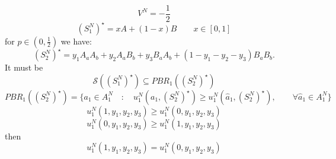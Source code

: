 \documentclass[a4paper, twoside, openany]{book}
\begin{document}
$$V^N = -\frac{1}{2}$$
$$(S^N_1)^{\star} = x A + (1 -x)B \qquad x \in [0, 1]$$
for $p \in (0, \frac{1}{2})$ we have:
$$(S^N_2)^{\star} = y_1 A_a A_b + y_2 A_a B_b + y_3 B_a A_b + (1 - y_1 - y_2 - y_3)B_a B_b.$$
It must be
$$\mathcal{S}((S^N_1)^{\star}) \subseteq PBR_1((S^N_2)^{\star})$$
$$PBR_1((S^N_2)^{\star}) = \{ a_1 \in A^N_1 \quad : \quad u^N_1(a_1, (S^N_2)^{\star}) \geq u^N_1(\hat{a}_1, (S^N_2)^{\star}), \qquad \forall \hat{a}_1 \in A^N_1 \}$$
$$u^N_1(1, y_1, y_2, y_3) \geq u^N_1(0, y_1, y_2, y_3)$$
$$u^N_1(0, y_1, y_2, y_3) \geq u^N_1(1, y_1, y_2, y_3)$$
then
$$u^N_1(1, y_1, y_2, y_3) = u^N_1(0, y_1, y_2, y_3)$$
\end{document}
